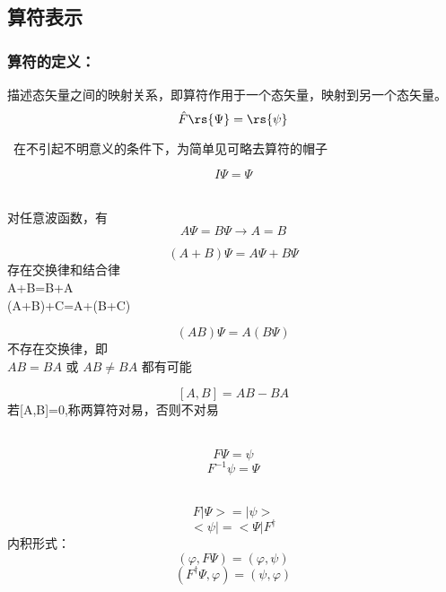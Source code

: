 \subsection{算符表示}

\begin{frame}
    \frametitle{算符的定义：}
    \begin{definition}[算符]
    描述态矢量之间的映射关系，即算符作用于一个态矢量，映射到另一个态矢量。
        \[\hat{F} \rs{\Psi}=\rs{\psi}\]
    \end{definition}
    \Tips~在不引起不明意义的条件下，为简单见可略去算符的帽子
    \begin{definition}[单位算符]
    \[I\Psi=\Psi \]
    \end{definition}   
\end{frame} 

\begin{frame}
    \begin{definition}[算符相等]
        ~~\\
    对任意波函数，有
        $$ A\Psi=B\Psi \to A=B $$
    \end{definition}
    \begin{definition}[算符的和]
        $$ (A+B)\Psi=A\Psi+B\Psi $$
        存在交换律和结合律\\
        A+B=B+A\\
        (A+B)+C=A+(B+C)
    \end{definition}
\end{frame} 

\begin{frame}
    \begin{definition} [算符的积]
        $$ (AB)\Psi=A(B\Psi) $$
        不存在交换律，即 \\
        $AB=BA$ 或 $AB\ne BA$ 都有可能
    \end{definition}
    \begin{definition}[对易子]
        $$ [A,B]=AB-BA$$
        若[A,B]=0,称两算符对易，否则不对易
    \end{definition}
\end{frame} 

\begin{frame}
    \begin{definition}[逆算符]   
        $$ F\Psi=\psi $$
        $$ F^{-1}\psi=\Psi $$
    \end{definition}
    \begin{definition}[伴算符] 
        $$ F|\Psi> = |\psi> $$
        $$ <\psi| = <\Psi|F^{\dagger} $$
        内积形式：
        $$ (\varphi,F\Psi)=(\varphi,\psi)$$ 
        $$ (F^\dagger \Psi,\varphi)=(\psi,\varphi)$$ 
    \end{definition}  
\end{frame} 


